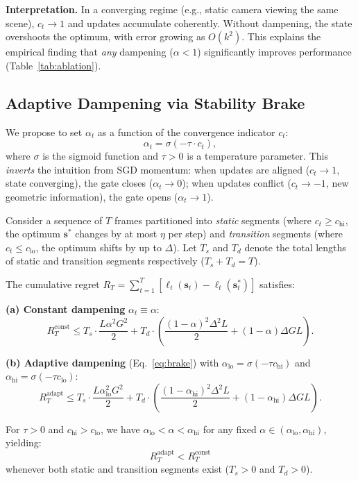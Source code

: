 \textbf{Interpretation.} In a converging regime (e.g., static camera viewing the same scene), $c_t \to 1$ and updates accumulate coherently. Without dampening, the state overshoots the optimum, with error growing as $O(k^2)$. This explains the empirical finding that \emph{any} dampening ($\alpha < 1$) significantly improves performance (Table~\ref{tab:ablation}).

\subsection{Adaptive Dampening via Stability Brake}

We propose to set $\alpha_t$ as a function of the convergence indicator $c_t$:
\begin{equation}
    \alpha_t = \sigma(-\tau \cdot c_t),
    \label{eq:brake}
\end{equation}
where $\sigma$ is the sigmoid function and $\tau > 0$ is a temperature parameter. This \emph{inverts} the intuition from SGD momentum: when updates are aligned ($c_t \to 1$, state converging), the gate closes ($\alpha_t \to 0$); when updates conflict ($c_t \to -1$, new geometric information), the gate opens ($\alpha_t \to 1$).

\begin{proposition}
\label{prop:regret}
Consider a sequence of $T$ frames partitioned into \emph{static} segments (where $c_t \geq c_{\text{hi}}$, the optimum $\mathbf{s}^*$ changes by at most $\eta$ per step) and \emph{transition} segments (where $c_t \leq c_{\text{lo}}$, the optimum shifts by up to $\Delta$). Let $T_s$ and $T_d$ denote the total lengths of static and transition segments respectively ($T_s + T_d = T$).

The cumulative regret $R_T = \sum_{t=1}^T [\ell_t(\mathbf{s}_t) - \ell_t(\mathbf{s}^*_t)]$ satisfies:

\textbf{(a) Constant dampening} $\alpha_t \equiv \alpha$:
\begin{equation}
    R_T^{\text{const}} \leq T_s \cdot \frac{L \alpha^2 G^2}{2} + T_d \cdot \left(\frac{(1-\alpha)^2 \Delta^2 L}{2} + (1-\alpha) \Delta G L\right).
\end{equation}

\textbf{(b) Adaptive dampening} (Eq.~\ref{eq:brake}) with $\alpha_{\text{lo}} = \sigma(-\tau c_{\text{hi}})$ and $\alpha_{\text{hi}} = \sigma(-\tau c_{\text{lo}})$:
\begin{equation}
    R_T^{\text{adapt}} \leq T_s \cdot \frac{L \alpha_{\text{lo}}^2 G^2}{2} + T_d \cdot \left(\frac{(1-\alpha_{\text{hi}})^2 \Delta^2 L}{2} + (1-\alpha_{\text{hi}}) \Delta G L\right).
\end{equation}

For $\tau > 0$ and $c_{\text{hi}} > c_{\text{lo}}$, we have $\alpha_{\text{lo}} < \alpha < \alpha_{\text{hi}}$ for any fixed $\alpha \in (\alpha_{\text{lo}}, \alpha_{\text{hi}})$, yielding:
\begin{equation}
    R_T^{\text{adapt}} < R_T^{\text{const}}
\end{equation}
whenever both static and transition segments exist ($T_s > 0$ and $T_d > 0$).
\end{proposition}

